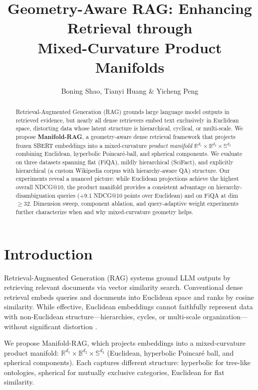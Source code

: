 \documentclass{article}
\title{Geometry-Aware RAG: Enhancing Retrieval through\\ Mixed-Curvature Product Manifolds}
\author{Boning Shao, Tianyi Huang \& Yicheng Peng}
\begin{document}
\maketitle

\begin{abstract}
Retrieval-Augmented Generation (RAG) grounds large language model outputs in retrieved evidence, but nearly all dense retrievers embed text exclusively in Euclidean space, distorting data whose latent structure is hierarchical, cyclical, or multi-scale.
We propose \textbf{Manifold-RAG}, a geometry-aware dense retrieval framework that projects frozen SBERT embeddings into a mixed-curvature \emph{product manifold} $\mathbb{R}^{d_1}\!\times\!\mathbb{B}^{d_2}\!\times\!\mathbb{S}^{d_3}$ combining Euclidean, hyperbolic Poincar\'e-ball, and spherical components.
We evaluate on three datasets spanning flat (FiQA), mildly hierarchical (SciFact), and explicitly hierarchical (a custom Wikipedia corpus with hierarchy-aware QA) structure.
Our experiments reveal a nuanced picture: while Euclidean projections achieve the highest overall NDCG@10, the product manifold provides a consistent advantage on hierarchy-disambiguation queries (+9.1 NDCG@10 points over Euclidean) and on FiQA at dim$\geq$32.
Dimension sweep, component ablation, and query-adaptive weight experiments further characterize when and why mixed-curvature geometry helps.
\end{abstract}

\section{Introduction}

Retrieval-Augmented Generation (RAG) systems ground LLM outputs by retrieving relevant documents via vector similarity search. Conventional dense retrieval embeds queries and documents into Euclidean space and ranks by cosine similarity. While effective, Euclidean embeddings cannot faithfully represent data with non-Euclidean structure---hierarchies, cycles, or multi-scale organization---without significant distortion \citep{nickel2017poincare, sala2018representation}.

We propose Manifold-RAG, which projects embeddings into a mixed-curvature product manifold: $\mathbb{R}^{d_1}\!\times\!\mathbb{B}^{d_2}\!\times\!\mathbb{S}^{d_3}$ (Euclidean, hyperbolic Poincar\'e ball, and spherical components). Each captures different structure: hyperbolic for tree-like ontologies, spherical for mutually exclusive categories, Euclidean for flat similarity.
\end{document}
